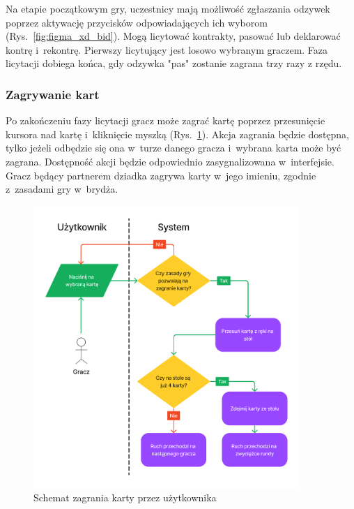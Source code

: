 Na etapie początkowym gry, uczestnicy mają możliwość zgłaszania odzywek poprzez
aktywację przycisków odpowiadających ich wyborom (Rys.~\ref{fig:figma_xd_bid}).
Mogą licytować kontrakty, pasować lub
deklarować kontrę i~rekontrę. Pierwszy licytujący jest losowo
wybranym graczem. Faza licytacji dobiega końca, gdy odzywka "pas"\xspace zostanie zagrana
trzy razy z rzędu.


\FloatBarrier


\subsubsection{Zagrywanie kart}

Po zakończeniu fazy licytacji gracz może zagrać kartę poprzez
przesunięcie kursora nad kartę i~kliknięcie myszką (Rys.~\ref{fig:figma_xd_play_card}).
Akcja zagrania
będzie dostępna, tylko jeżeli odbędzie się ona w~turze danego gracza
i~wybrana karta może być zagrana.
Dostępność akcji będzie odpowiednio zasygnalizowana w~interfejsie.
Gracz będący partnerem dziadka zagrywa karty w~jego imieniu,
zgodnie z~zasadami gry w~brydża.

\begin{figure}[hbt!]
    \centering
    \includegraphics[width=0.9\textwidth]{img/schematy/play_card.png}
    \caption{Schemat zagrania karty przez użytkownika}
    \label{fig:figma_xd_play_card}
\end{figure}

